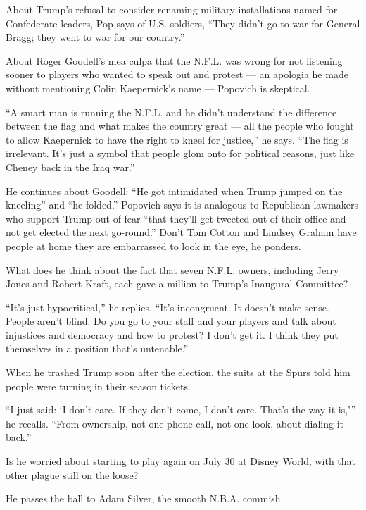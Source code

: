 About Trump's refusal to consider renaming military installations named
for Confederate leaders, Pop says of U.S. soldiers, ``They didn't go to
war for General Bragg; they went to war for our country.''

About Roger Goodell's mea culpa that the N.F.L. was wrong for not
listening sooner to players who wanted to speak out and protest --- an
apologia he made without mentioning Colin Kaepernick's name --- Popovich
is skeptical.

``A smart man is running the N.F.L. and he didn't understand the
difference between the flag and what makes the country great --- all the
people who fought to allow Kaepernick to have the right to kneel for
justice,'' he says. ``The flag is irrelevant. It's just a symbol that
people glom onto for political reasons, just like Cheney back in the
Iraq war.''

He continues about Goodell: ``He got intimidated when Trump jumped on
the kneeling'' and ``he folded.'' Popovich says it is analogous to
Republican lawmakers who support Trump out of fear ``that they'll get
tweeted out of their office and not get elected the next go-round.''
Don't Tom Cotton and Lindsey Graham have people at home they are
embarrassed to look in the eye, he ponders.

What does he think about the fact that seven N.F.L. owners, including
Jerry Jones and Robert Kraft, each gave a million to Trump's Inaugural
Committee?

``It's just hypocritical,'' he replies. ``It's incongruent. It doesn't
make sense. People aren't blind. Do you go to your staff and your
players and talk about injustices and democracy and how to protest? I
don't get it. I think they put themselves in a position that's
untenable.''

When he trashed Trump soon after the election, the suits at the Spurs
told him people were turning in their season tickets.

``I just said: `I don't care. If they don't come, I don't care. That's
the way it is,''' he recalls. ``From ownership, not one phone call, not
one look, about dialing it back.''

Is he worried about starting to play again on
\href{https://www.nytimes3xbfgragh.onion/2020/06/02/sports/basketball/disney-world-nba-sports-complex.html}{July
30 at Disney World}, with that other plague still on the loose?

He passes the ball to Adam Silver, the smooth N.B.A. commish.

